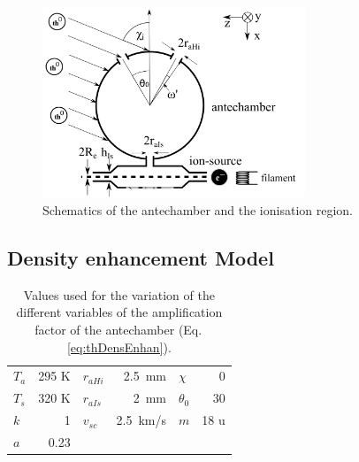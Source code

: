 	\begin{figure}[h]
		\centering
		\includegraphics[width= 0.7\textwidth]{Bilder/particleDensEnh.png}
		\caption{Schematics of the antechamber and the ionisation region.}
		\label{fig:thAntIs}
	\end{figure}

	\subsection{Density enhancement Model }\label{subsubsec:Densenhan}
	\begin{table}
		\begin{center}
			\begin{tabular}{|l r |l r |l r|}
				\hline
				$T_a$ 	& 295 K	& $r_{aHi}$	& 2.5\, mm	& $\chi$	& 0\degree \\
				$T_s$ 	& 320 K & $r_{aIs}$ & 2\, mm	& $\theta_0$& 30\degree\\	
				$k$		&	1	& $v_{sc}$	& 2.5\, km/s& $m$		& 18 u\\
				$a$		& 0.23	&			&			&			&	\\
				\hline
			\end{tabular}
		\end{center}
		\caption{Values used for the variation of the different variables of the amplification factor of the antechamber (Eq.\,\eqref{eq:thDensEnhan}).}
		\label{tab:thDensEnhan}
	\end{table}
	
